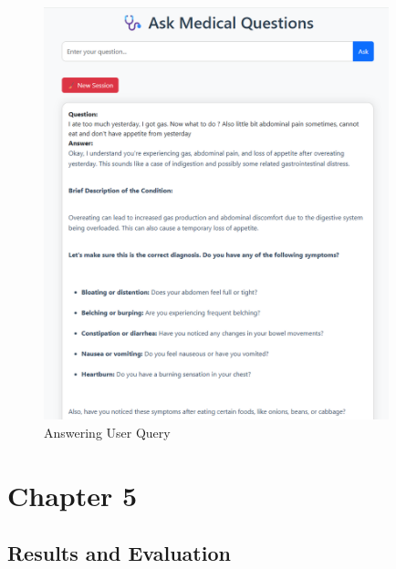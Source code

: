 \documentclass[12pt,a4paper]{report}
\begin{document}
\begin{figure}[H]
    \centering
    \includegraphics[width=10cm, height=12cm]{QueryAnswer}
    \caption{Answering User Query}
    \label{fig:AnsweringUserQuery}
\end{figure}









	{\vfill \chapter*{\centering \vfill Chapter 5 \vfill}\vfill}
	\thispagestyle{empty}
	\newpage
	\label{Results and Evaluation}
	\section{Results and Evaluation}
	
\end{document}
